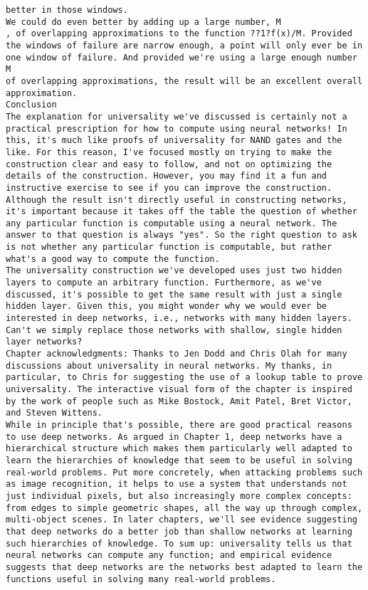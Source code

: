 \begin{lstlisting}
better in those windows.
We could do even better by adding up a large number, M
, of overlapping approximations to the function ??1?f(x)/M. Provided the windows of failure are narrow enough, a point will only ever be in one window of failure. And provided we're using a large enough number M
of overlapping approximations, the result will be an excellent overall approximation.
Conclusion
The explanation for universality we've discussed is certainly not a practical prescription for how to compute using neural networks! In this, it's much like proofs of universality for NAND gates and the like. For this reason, I've focused mostly on trying to make the construction clear and easy to follow, and not on optimizing the details of the construction. However, you may find it a fun and instructive exercise to see if you can improve the construction.
Although the result isn't directly useful in constructing networks, it's important because it takes off the table the question of whether any particular function is computable using a neural network. The answer to that question is always "yes". So the right question to ask is not whether any particular function is computable, but rather what's a good way to compute the function.
The universality construction we've developed uses just two hidden layers to compute an arbitrary function. Furthermore, as we've discussed, it's possible to get the same result with just a single hidden layer. Given this, you might wonder why we would ever be interested in deep networks, i.e., networks with many hidden layers. Can't we simply replace those networks with shallow, single hidden layer networks?
Chapter acknowledgments: Thanks to Jen Dodd and Chris Olah for many discussions about universality in neural networks. My thanks, in particular, to Chris for suggesting the use of a lookup table to prove universality. The interactive visual form of the chapter is inspired by the work of people such as Mike Bostock, Amit Patel, Bret Victor, and Steven Wittens. 
While in principle that's possible, there are good practical reasons to use deep networks. As argued in Chapter 1, deep networks have a hierarchical structure which makes them particularly well adapted to learn the hierarchies of knowledge that seem to be useful in solving real-world problems. Put more concretely, when attacking problems such as image recognition, it helps to use a system that understands not just individual pixels, but also increasingly more complex concepts: from edges to simple geometric shapes, all the way up through complex, multi-object scenes. In later chapters, we'll see evidence suggesting that deep networks do a better job than shallow networks at learning such hierarchies of knowledge. To sum up: universality tells us that neural networks can compute any function; and empirical evidence suggests that deep networks are the networks best adapted to learn the functions useful in solving many real-world problems.

\end{lstlisting}
